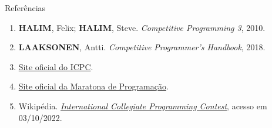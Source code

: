 \begin{frame}[fragile]{Referências}

    \begin{enumerate}
        \item \textbf{HALIM}, Felix; \textbf{HALIM}, Steve. \textit{Competitive Programming 3}, 2010.
        \item \textbf{LAAKSONEN}, Antti. \textit{Competitive Programmer's Handbook}, 2018.

        \item \href{https://icpc.baylor.edu/}{Site oficial do ICPC}.

        \item \href{http://maratona.ime.usp.br/}{Site oficial da Maratona de Programação}.

        \item Wikipédia. \href{https://en.wikipedia.org/wiki/ACM\_International\_Collegiate\_Programming\_Contest}{\it International Collegiate Programming Contest}, acesso em 03/10/2022.


    \end{enumerate}

\end{frame}
